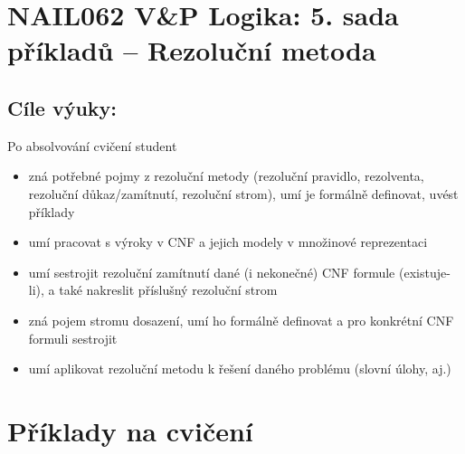 \section*{NAIL062 V\&P Logika: 5. sada příkladů -- Rezoluční metoda}


\subsection*{Cíle výuky:} Po absolvování cvičení student

    \begin{itemize}\setlength{\itemsep}{0pt}
        \item zná potřebné pojmy z rezoluční metody (rezoluční pravidlo, rezolventa, rezoluční důkaz/zamítnutí, rezoluční strom), umí je formálně definovat, uvést příklady
        \item umí pracovat s výroky v CNF a jejich modely v množinové reprezentaci
        \item umí sestrojit rezoluční zamítnutí dané (i nekonečné) CNF formule (existuje-li), a také nakreslit příslušný rezoluční strom
        \item zná pojem stromu dosazení, umí ho formálně definovat a pro konkrétní CNF formuli sestrojit
        \item umí aplikovat rezoluční metodu k řešení daného problému (slovní úlohy, aj.)
    \end{itemize}
    

\section*{Příklady na cvičení}



